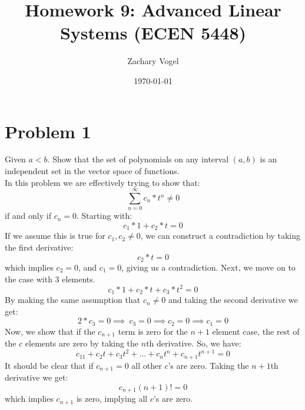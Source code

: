 \documentclass{article}
\title{Homework 9: Advanced Linear Systems (ECEN 5448)}
\author{Zachary Vogel}
\date{\today}
\begin{document}
\maketitle

\section*{Problem 1}
Given $a<b$. Show that the set of polynomials on any interval $(a,b)$ is an independent set in the vector space of functions.\\
In this problem we are effectively trying to show that:
\[\sum_{n=0}^\infty c_n*t^{n}\neq 0\]
if and only if $c_n=0$. Starting with:
\[c_1*1+c_2*t=0\]
If we assume this is true for $c_1,c_2\neq 0$, we can construct a contradiction by taking the first derivative:
\[c_2*t=0\]
which implies $c_2=0$, and $c_1=0$, giving us a contradiction. Next, we move on to the case with 3 elements.
\[c_1*1+c_2*t+c_3*t^2=0\]
By making the same assumption that $c_n\neq 0$ and taking the second derivative we get:
\[2*c_3=0\implies\ c_3=0\implies c_2=0\implies c_1=0\]
Now, we show that if the $c_{n+1}$ term is zero for the $n+1$ element case, the rest of the $c$ elements are zero by taking the $n$th derivative. So, we have:
\[c_11+c_2t+c_3t^2+\dots+c_{n}t^n+c_{n+1}t^{n+1}=0\]
It should be clear that if $c_{n+1}=0$ all other $c$'s are zero. Taking the $n+1$th derivative we get:
\[c_{n+1}(n+1)!=0\]
which implies $c_{n+1}$ is zero, implying all $c$'s are zero.
\end{document}
